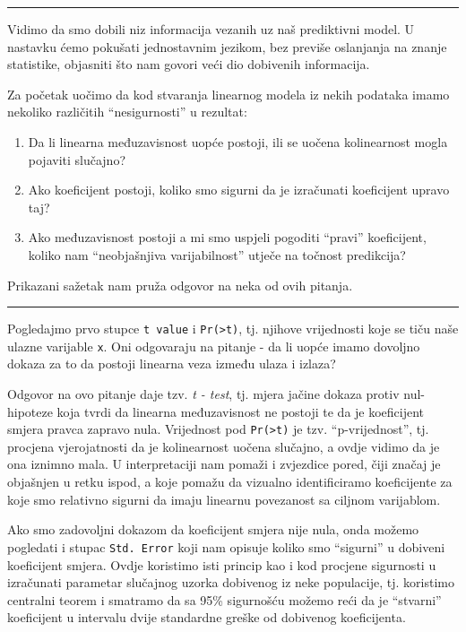 \documentclass[]{book}
\providecommand{\tightlist}{%
  \setlength{\itemsep}{0pt}\setlength{\parskip}{0pt}}
\theoremstyle{definition}
\theoremstyle{definition}
\theoremstyle{definition}
\theoremstyle{remark}
\begin{document}
\begin{center}\rule{0.5\linewidth}{\linethickness}\end{center}

Vidimo da smo dobili niz informacija vezanih uz naš prediktivni model. U
nastavku ćemo pokušati jednostavnim jezikom, bez previše oslanjanja na
znanje statistike, objasniti što nam govori veći dio dobivenih
informacija.

Za početak uočimo da kod stvaranja linearnog modela iz nekih podataka
imamo nekoliko različitih ``nesigurnosti'' u rezultat:

\begin{enumerate}
\def\labelenumi{\arabic{enumi})}
\tightlist
\item
  Da li linearna međuzavisnost uopće postoji, ili se uočena kolinearnost
  mogla pojaviti slučajno?
\item
  Ako koeficijent postoji, koliko smo sigurni da je izračunati
  koeficijent upravo taj?
\item
  Ako međuzavisnost postoji a mi smo uspjeli pogoditi ``pravi''
  koeficijent, koliko nam ``neobjašnjiva varijabilnost'' utječe na
  točnost predikcija?
\end{enumerate}

Prikazani sažetak nam pruža odgovor na neka od ovih pitanja.

\begin{center}\rule{0.5\linewidth}{\linethickness}\end{center}

Pogledajmo prvo stupce \texttt{t\ value} i
\texttt{Pr(\textgreater{}\textbar{}t\textbar{})}, tj. njihove
vrijednosti koje se tiču naše ulazne varijable \texttt{x}. Oni
odgovaraju na pitanje - da li uopće imamo dovoljno dokaza za to da
postoji linearna veza između ulaza i izlaza?

Odgovor na ovo pitanje daje tzv. \emph{t - test}, tj. mjera jačine
dokaza protiv nul-hipoteze koja tvrdi da linearna međuzavisnost ne
postoji te da je koeficijent smjera pravca zapravo nula. Vrijednost pod
\texttt{Pr(\textgreater{}\textbar{}t\textbar{})} je tzv.
``p-vrijednost'', tj. procjena vjerojatnosti da je kolinearnost uočena
slučajno, a ovdje vidimo da je ona iznimno mala. U interpretaciji nam
pomaži i zvjezdice pored, čiji značaj je objašnjen u retku ispod, a koje
pomažu da vizualno identificiramo koeficijente za koje smo relativno
sigurni da imaju linearnu povezanost sa ciljnom varijablom.

Ako smo zadovoljni dokazom da koeficijent smjera nije nula, onda možemo
pogledati i stupac \texttt{Std.\ Error} koji nam opisuje koliko smo
``sigurni'' u dobiveni koeficijent smjera. Ovdje koristimo isti princip
kao i kod procjene sigurnosti u izračunati parametar slučajnog uzorka
dobivenog iz neke populacije, tj. koristimo centralni teorem i smatramo
da sa 95\% sigurnošću možemo reći da je ``stvarni'' koeficijent u
intervalu dvije standardne greške od dobivenog koeficijenta.
\end{document}
